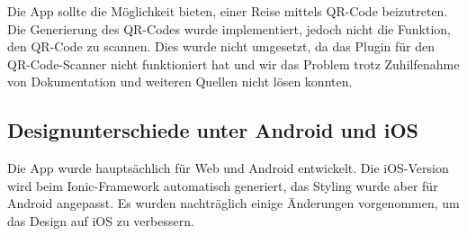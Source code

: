 Die App sollte die Möglichkeit bieten, einer Reise mittels QR-Code beizutreten.
Die Generierung des QR-Codes wurde implementiert, jedoch nicht die Funktion, den QR-Code zu scannen.
Dies wurde nicht umgesetzt, da das Plugin für den QR-Code-Scanner nicht funktioniert hat und wir das Problem trotz Zuhilfenahme von Dokumentation und weiteren Quellen nicht lösen konnten.

\subsection{Designunterschiede unter Android und iOS}\label{Design}

Die App wurde hauptsächlich für Web und Android entwickelt.
Die iOS-Version wird beim Ionic-Framework automatisch generiert, das Styling wurde aber für Android angepasst.
Es wurden nachträglich einige Änderungen vorgenommen, um das Design auf iOS zu verbessern.